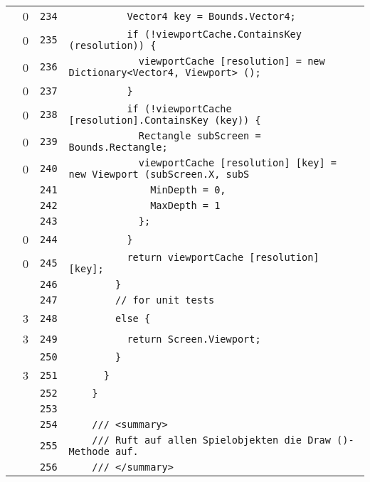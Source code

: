 \documentclass[a4paper,10pt]{article}
\begin{document}
\begin{longtable}[l]{lrrl}
\cellcolor{red} & 0 & \verb~234~ & \verb~          Vector4 key = Bounds.Vector4;~\\
\cellcolor{red} & 0 & \verb~235~ & \verb~          if (!viewportCache.ContainsKey (resolution)) {~\\
\cellcolor{red} & 0 & \verb~236~ & \verb~            viewportCache [resolution] = new Dictionary<Vector4, Viewport> ();~\\
\cellcolor{red} & 0 & \verb~237~ & \verb~          }~\\
\cellcolor{red} & 0 & \verb~238~ & \verb~          if (!viewportCache [resolution].ContainsKey (key)) {~\\
\cellcolor{red} & 0 & \verb~239~ & \verb~            Rectangle subScreen = Bounds.Rectangle;~\\
\cellcolor{red} & 0 & \verb~240~ & \verb~            viewportCache [resolution] [key] = new Viewport (subScreen.X, subS~\\
\cellcolor{gray} &  & \verb~241~ & \verb~              MinDepth = 0,~\\
\cellcolor{gray} &  & \verb~242~ & \verb~              MaxDepth = 1~\\
\cellcolor{gray} &  & \verb~243~ & \verb~            };~\\
\cellcolor{red} & 0 & \verb~244~ & \verb~          }~\\
\cellcolor{red} & 0 & \verb~245~ & \verb~          return viewportCache [resolution] [key];~\\
\cellcolor{gray} &  & \verb~246~ & \verb~        }~\\
\cellcolor{gray} &  & \verb~247~ & \verb~        // for unit tests~\\
\cellcolor{green} & 3 & \verb~248~ & \verb~        else {~\\
\cellcolor{green} & 3 & \verb~249~ & \verb~          return Screen.Viewport;~\\
\cellcolor{gray} &  & \verb~250~ & \verb~        }~\\
\cellcolor{green} & 3 & \verb~251~ & \verb~      }~\\
\cellcolor{gray} &  & \verb~252~ & \verb~    }~\\
\cellcolor{gray} &  & \verb~253~ & \verb~~\\
\cellcolor{gray} &  & \verb~254~ & \verb~    /// <summary>~\\
\cellcolor{gray} &  & \verb~255~ & \verb~    /// Ruft auf allen Spielobjekten die Draw ()-Methode auf.~\\
\cellcolor{gray} &  & \verb~256~ & \verb~    /// </summary>~\\

\end{longtable}
\end{document}
